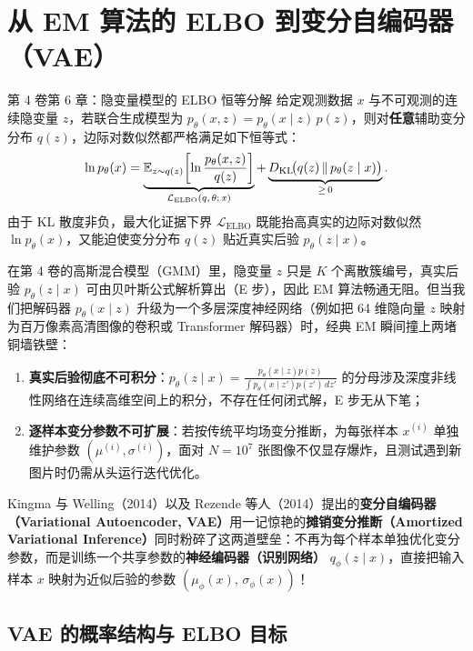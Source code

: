 \section{从 EM 算法的 ELBO 到变分自编码器（VAE）}
\label{sec:vae}

\begin{recallBox}{第 4 卷第 6 章：隐变量模型的 ELBO 恒等分解}
给定观测数据 $x$ 与不可观测的连续隐变量 $z$，若联合生成模型为 $p_\theta(x, z) = p_\theta(x \mid z)\, p(z)$，则对\textbf{任意}辅助变分分布 $q(z)$，边际对数似然都严格满足如下恒等式：
\begin{equation}
  \ln p_\theta(x)
  = \underbrace{\mathbb{E}_{z \sim q(z)}\!\left[\ln \frac{p_\theta(x, z)}{q(z)}\right]}_{\mathcal{L}_{\mathrm{ELBO}}(q,\, \theta;\, x)}
  + \underbrace{D_{\mathrm{KL}}\!\big(q(z) \,\|\, p_\theta(z \mid x)\big)}_{\ge\, 0}.
  \label{eq:elbo-recall}
\end{equation}
由于 KL 散度非负，最大化证据下界 $\mathcal{L}_{\mathrm{ELBO}}$ 既能抬高真实的边际对数似然 $\ln p_\theta(x)$，又能迫使变分分布 $q(z)$ 贴近真实后验 $p_\theta(z \mid x)$。
\end{recallBox}

在第 4 卷的高斯混合模型（GMM）里，隐变量 $z$ 只是 $K$ 个离散簇编号，真实后验 $p_\theta(z \mid x)$ 可由贝叶斯公式解析算出（E 步），因此 EM 算法畅通无阻。但当我们把解码器 $p_\theta(x \mid z)$ 升级为一个多层深度神经网络（例如把 64 维隐向量 $z$ 映射为百万像素高清图像的卷积或 Transformer 解码器）时，经典 EM 瞬间撞上两堵铜墙铁壁：
\begin{enumerate}
  \item \textbf{真实后验彻底不可积分}：$p_\theta(z \mid x) = \frac{p_\theta(x \mid z)p(z)}{\int p_\theta(x \mid z')p(z')\,dz'}$ 的分母涉及深度非线性网络在连续高维空间上的积分，不存在任何闭式解，E 步无从下笔；
  \item \textbf{逐样本变分参数不可扩展}：若按传统平均场变分推断，为每张样本 $x^{(i)}$ 单独维护参数 $(\mu^{(i)}, \sigma^{(i)})$，面对 $N = 10^7$ 张图像不仅显存爆炸，且测试遇到新图片时仍需从头运行迭代优化。
\end{enumerate}

Kingma 与 Welling（2014）以及 Rezende 等人（2014）提出的\textbf{变分自编码器（Variational Autoencoder, VAE）}用一记惊艳的\textbf{摊销变分推断（Amortized Variational Inference）}同时粉碎了这两道壁垒：不再为每个样本单独优化变分参数，而是训练一个共享参数的\textbf{神经编码器（识别网络）} $q_\phi(z \mid x)$，直接把输入样本 $x$ 映射为近似后验的参数 $(\mu_\phi(x),\, \sigma_\phi(x))$！

\subsection{VAE 的概率结构与 ELBO 目标}

